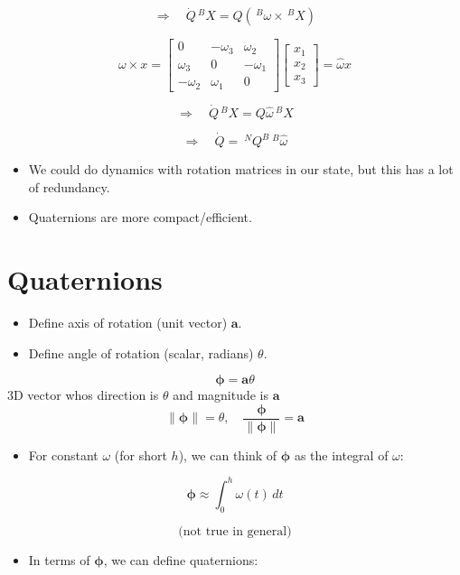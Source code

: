 \documentclass[11pt]{article}
\begin{document}
\[
\Rightarrow \quad \dot{Q} \, ^B X = Q (\, ^B \omega \times \, ^B X)
\]

\[
\omega \times x =
\begin{bmatrix}
    0 & -\omega_3 & \omega_2 \\
    \omega_3 & 0 & -\omega_1 \\
    -\omega_2 & \omega_1 & 0
\end{bmatrix}
\begin{bmatrix}
    x_1 \\ x_2 \\ x_3
\end{bmatrix}
= \hat{\omega} x
\]

\[
\Rightarrow \quad \dot{Q} \, ^B X = Q \hat{\omega} \, ^B X
\]

\[
\Rightarrow \quad \boxed{\dot{Q} =\ ^NQ^B \ ^B{\hat{\omega}}}
\]


\begin{itemize}
    \item We could do dynamics with rotation matrices in our state, but this has a lot of redundancy.
    \item Quaternions are more compact/efficient.
\end{itemize}

\section*{Quaternions}
\begin{itemize}
    \item Define axis of rotation (unit vector) $\mathbf{a}$.
    \item Define angle of rotation (scalar, radians) $\theta$.
\end{itemize}

\[
\boldsymbol{\phi} = \mathbf{a} \theta
\]
3D vector whos direction is $\theta$ and magnitude is $\mathbf{a}$
\[
\|\boldsymbol{\phi}\| = \theta, \quad \frac{\boldsymbol{\phi}}{\|\boldsymbol{\phi}\|} = \mathbf{a}
\]

\begin{itemize}
    \item For constant $\omega$ (for short $h$), we can think of $\boldsymbol{\phi}$ as the integral of $\omega$:
\end{itemize}

\[
\boldsymbol{\phi} \approx \int_0^h \omega(t) \, dt
\]

\[
\text{(not true in general)}
\]


\begin{itemize}
    \item In terms of $\boldsymbol{\phi}$, we can define quaternions:
\end{itemize}
\end{document}
